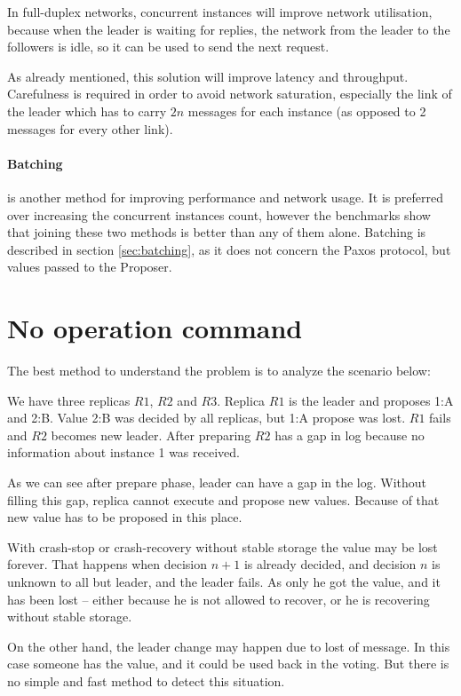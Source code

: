 In full-duplex networks, concurrent instances will improve network utilisation, because when the leader is waiting for replies, the network from the leader to the followers is idle, so it can be used to send the next request. 

As already mentioned, this solution will improve latency and throughput. Carefulness is required in order to avoid network saturation, especially the link of the leader which has to carry $2n$ messages for each instance (as opposed to 2 messages for every other link).

\paragraph{Batching} is another method for improving performance and network usage. It is preferred over increasing the concurrent instances count, however the benchmarks show that joining these two methods is better than any of them alone. Batching is described in section \ref{sec:batching}, as it does not concern the Paxos protocol, but values passed to the Proposer.

\section{No operation command}

The best method to understand the problem is to analyze the scenario below:

We have three replicas $R1$, $R2$ and $R3$. Replica $R1$ is the leader and proposes {1:A} and {2:B}. Value {2:B} was decided by all replicas, but {1:A} propose was lost. $R1$ fails and $R2$ becomes new leader. After preparing $R2$ has a gap in log because no information about instance 1 was received. 

As we can see after prepare phase, leader can have a gap in the log. Without filling this gap, replica cannot execute and propose new values. Because of that new value has to be proposed in this place.

With crash-stop or crash-recovery without stable storage the value may be lost forever. That happens when decision $n+1$ is already decided, and decision $n$ is unknown to all but leader, and the leader fails. As only he got the value, and it has been lost -- either because he is not allowed to recover, or he is recovering without stable storage.

On the other hand, the leader change may happen due to lost of \alive message. In this case someone has the value, and it could be used back in the voting. But there is no simple and fast method to detect this situation.

